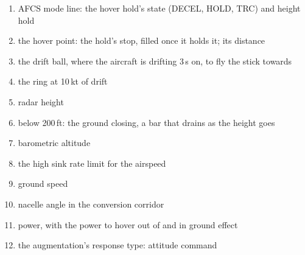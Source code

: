 \begin{enumerate}[label=\textbf{\arabic*},leftmargin=*,itemsep=0pt]
\item AFCS mode line: the hover hold's state (DECEL, HOLD, TRC) and height hold
\item the hover point: the hold's stop, filled once it holds it; its distance
\item the drift ball, where the aircraft is drifting 3\,s on, to fly the stick towards
\item the ring at 10\,kt of drift
\item radar height
\item below 200\,ft: the ground closing, a bar that drains as the height goes
\item barometric altitude
\item the high sink rate limit for the airspeed
\item ground speed
\item nacelle angle in the conversion corridor
\item power, with the power to hover out of and in ground effect
\item the augmentation's response type: attitude command
\end{enumerate}
